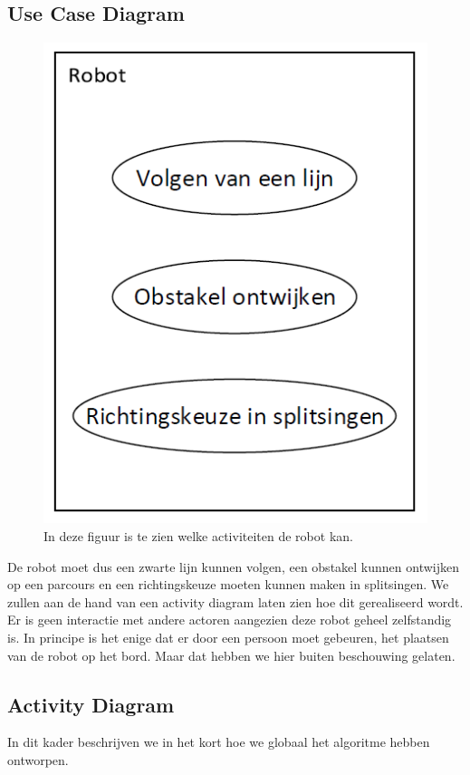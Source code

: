 \documentclass[12pt]{article}
\begin{document}
		\subsection{Use Case Diagram}
		\begin{center}
			\begin{figure}
				\includegraphics[scale=.7]{UseCase}
				\caption{In deze figuur is te zien welke activiteiten de robot kan.}
			\end{figure}
		\end{center}
		De robot moet dus een zwarte lijn kunnen volgen, een obstakel kunnen ontwijken op een parcours en een richtingskeuze moeten kunnen maken in splitsingen. We zullen aan de hand van een activity diagram laten zien hoe dit gerealiseerd wordt. \\Er is geen interactie met andere actoren aangezien deze robot geheel zelfstandig is. In principe is het enige dat er door een persoon moet gebeuren, het plaatsen van de robot op het bord. Maar dat hebben we hier buiten beschouwing gelaten.
	\subsection{Activity Diagram}
		In dit kader beschrijven we in het kort hoe we globaal het algoritme hebben ontworpen.
\newpage
\end{document}
